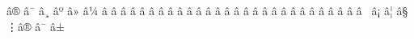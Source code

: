 \mubyte \nVdash ^^e2^^8a^^ae\endmubyte %
\mubyte \nVDash ^^e2^^8a^^af\endmubyte %
\mubyte \multimap ^^e2^^8a^^b8\endmubyte %
\mubyte \intercal ^^e2^^8a^^ba\endmubyte %
\mubyte \veebar ^^e2^^8a^^bb\endmubyte %
\mubyte \barwedge ^^e2^^8a^^bc\endmubyte %
\mubyte \bigwedge ^^e2^^8b^^80\endmubyte %
\mubyte \bigvee ^^e2^^8b^^81\endmubyte %
\mubyte \bigcap ^^e2^^8b^^82\endmubyte %
\mubyte \bigcup ^^e2^^8b^^83\endmubyte %
\mubyte \diamond ^^e2^^8b^^84\endmubyte %
\mubyte \cdot ^^e2^^8b^^85\endmubyte %
\mubyte \star ^^e2^^8b^^86\endmubyte %
\mubyte \divideontimes ^^e2^^8b^^87\endmubyte %
\mubyte \bowtie ^^e2^^8b^^88\endmubyte %
\mubyte \ltimes ^^e2^^8b^^89\endmubyte %
\mubyte \rtimes ^^e2^^8b^^8a\endmubyte %
\mubyte \leftthreetimes ^^e2^^8b^^8b\endmubyte %
\mubyte \rightthreetimes ^^e2^^8b^^8c\endmubyte %
\mubyte \backsimeq ^^e2^^8b^^8d\endmubyte %
\mubyte \curlyvee ^^e2^^8b^^8e\endmubyte %
\mubyte \curlywedge ^^e2^^8b^^8f\endmubyte %
\mubyte \Subset ^^e2^^8b^^90\endmubyte %
\mubyte \Supset ^^e2^^8b^^91\endmubyte %
\mubyte \Cap ^^e2^^8b^^92\endmubyte %
\mubyte \Cup ^^e2^^8b^^93\endmubyte %
\mubyte \pitchfork ^^e2^^8b^^94\endmubyte %
\mubyte \lessdot ^^e2^^8b^^96\endmubyte %
\mubyte \grtdot ^^e2^^8b^^97\endmubyte %
\mubyte \ggg ^^e2^^8b^^98\endmubyte %
\mubyte \lll ^^e2^^8b^^99\endmubyte %
\mubyte \lesseqqgtr ^^e2^^8b^^9a\endmubyte %
\mubyte \grteqqless ^^e2^^8b^^9b\endmubyte %
\mubyte \npreceq ^^e2^^8b^^a0\endmubyte %
\mubyte \nsucceq ^^e2^^8b^^a1\endmubyte %
\mubyte \lnsim ^^e2^^8b^^a6\endmubyte %
\mubyte \gnsim ^^e2^^8b^^a7\endmubyte %
\mubyte \vdots ^^e2^^8b^^ae\endmubyte %
\mubyte \cdots ^^e2^^8b^^af\endmubyte %
\mubyte \ddots ^^e2^^8b^^b1\endmubyte %

